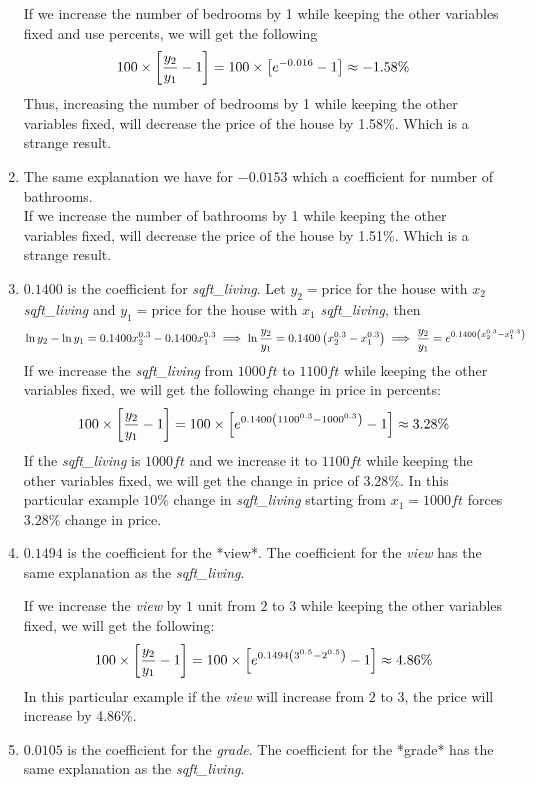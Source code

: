 \documentclass[10pt]{article}
\begin{document}
\begin{enumerate}
If we increase the number of bedrooms by 1 while keeping the other variables fixed and use percents, we will get the following
$$
\large
100 \times \left[\frac{y_2}{y_1} - 1 \right] = 100 \times \left[e^{-0.016} -1 \right] \approx -1.58\%
$$
Thus, increasing the number of bedrooms by 1 while keeping the other variables fixed, will decrease the price of the house by 1.58\%. Which is a strange result.
\item The same explanation we have for $-0.0153$ which a coefficient for number of bathrooms. \\
If we increase the number of bathrooms by 1 while keeping the other variables fixed, will decrease the price of the house by 1.51\%. Which is a strange result.
 \item $0.1400$ is the coefficient for {\it sqft\_living}.
Let $y_2 = \text{price}$ for the house with $x_2$ {\it sqft\_living} and $y_1 = \text{price}$ for the house with $x_1$ {\it sqft\_living}, then 
$$
\large
\ln y_2 - \ln y_1 = 0.1400 x_2^{0.3} - 0.1400 x_1^{0.3} \implies \ln \frac{y_2}{y_1} = 0.1400 \left( x_2^{0.3} - x_1^{0.3}\right)\implies \frac{y_2}{y_1}=e^{0.1400 \left( x_2^{0.3} - x_1^{0.3}\right)}
$$
If we increase the {\it sqft\_living} from $1000ft$ to $1100ft$ while keeping the other variables fixed, we will get the following change in price in percents:
$$
\large
100 \times \left[\frac{y_2}{y_1} -1  \right] = 100 \times \left[ e^{0.1400 \left( 1100^{0.3} - 1000^{0.3}\right)} - 1 \right]\approx 3.28\%
$$
If the {\it sqft\_living} is $1000ft$ and we increase it to $1100ft$ while keeping the other variables fixed, we will get the change in price of $3.28\%$. In this particular example $10\%$ change in {\it sqft\_living} starting from $x_1 = 1000ft$ forces $3.28\%$ change in price.
\item  $0.1494$ is the coefficient for the *view*.
The coefficient for the {\it view} has the same explanation as the {\it sqft\_living}.

If we increase the {\it view} by $1$ unit from $2$ to $3$ while keeping the other variables fixed, we will get the following:
$$
\large 
100 \times \left[\frac{y_2}{y_1} -1  \right] = 100 \times \left[ e^{0.1494 \left( 3^{0.5} - 2^{0.5}\right)} - 1 \right]\approx 4.86\%
$$
In this particular example if the {\it view} will increase from $2$ to $3$, the price will increase by 4.86\%.

\item $0.0105$ is the coefficient for the {\it grade}. 
The coefficient for the *grade* has the same explanation as the {\it sqft\_living}.


\end{enumerate}
\end{document}
